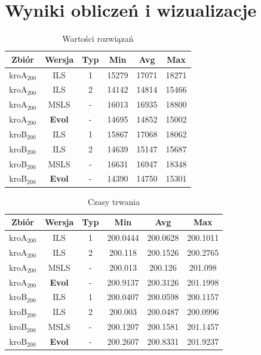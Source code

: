 \documentclass{article}
\begin{document}
\vspace{10mm}

\section{Wyniki obliczeń i wizualizacje}

\begin{table}[h!]
\centering
\begin{tabular}{ |c|c|c|c|c|c| } 
 \hline
 Zbiór & Wersja & Typ & Min & Avg & Max \\ 
  \hline
 kroA$_{200}$ & ILS & 1 & 15279 & 17071 & 18271  \\ 
  \hline
 kroA$_{200}$ & ILS & 2 & 14142 & 14814 & 15466 \\ 
 \hline
 kroA$_{200}$ & MSLS & - & 16013 & 16935 & 18800 \\
  \hline
 kroA$_{200}$ &  \textbf{Evol} & - & 14695 & 14852 & 15002 \\
  \hline
 kroB$_{200}$ & ILS & 1 & 15867 & 17068 & 18062 \\ 
  \hline
 kroB$_{200}$ & ILS & 2 & 14639 & 15147 & 15687 \\ 
 \hline
 kroB$_{200}$ & MSLS & - & 16631 & 16947 & 18348 \\
  \hline
 kroB$_{200}$ &  \textbf{Evol} & - & 14390 & 14750 & 15301 \\
 \hline
\end{tabular}
\caption{Wartości rozwiązań}
\end{table}

\begin{table}[h!]
\centering
\begin{tabular}{ |c|c|c|c|c|c| } 
 \hline
 Zbiór & Wersja & Typ & Min & Avg & Max \\ 
  \hline
 kroA$_{200}$ & ILS & 1 & 200.0444 & 200.0628 & 200.1011 \\
  \hline
 kroA$_{200}$ & ILS & 2 & 200.118 & 200.1526 & 200.2765 \\
 \hline
 kroA$_{200}$ & MSLS & - & 200.013 & 200.126 & 201.098 \\
  \hline
 kroA$_{200}$ & \textbf{Evol} & - & 200.9137 & 200.3126 & 201.1998 \\
  \hline
 kroB$_{200}$ & ILS & 1 & 200.0407 & 200.0598 & 200.1157 \\
  \hline
 kroB$_{200}$ & ILS & 2 & 200.003 & 200.0487 & 200.0996 \\
 \hline
 kroB$_{200}$ & MSLS & - & 200.1207 & 200.1581 & 201.1457 \\
 \hline
 kroB$_{200}$ &  \textbf{Evol} & - & 200.2607 & 200.8331 & 201.9237 \\
 \hline
\end{tabular}
\caption{Czasy trwania}
\end{table}
\end{document}
